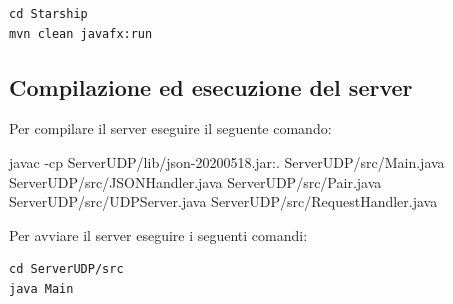 \documentclass{article}
\newenvironment{commandbox}{%
  \begin{tcolorbox}[colback=white,colframe=black!50!white,sharp corners,width=\textwidth]%
  \ttfamily
}{%
  \end{tcolorbox}%
}
\begin{document}
\begin{commandbox}
\begin{verbatim}
cd Starship
mvn clean javafx:run
\end{verbatim}
\end{commandbox}

\subsection{Compilazione ed esecuzione del server}

Per compilare il server eseguire il seguente comando:
\begin{commandbox}
javac -cp ServerUDP/lib/json-20200518.jar:. ServerUDP/src/Main.java ServerUDP/src/JSONHandler.java ServerUDP/src/Pair.java ServerUDP/src/UDPServer.java ServerUDP/src/RequestHandler.java
\end{commandbox}

Per avviare il server eseguire i seguenti comandi:
\begin{commandbox}
\begin{verbatim}
cd ServerUDP/src
java Main
\end{verbatim}
\end{commandbox}



\clearpage
\end{document}
